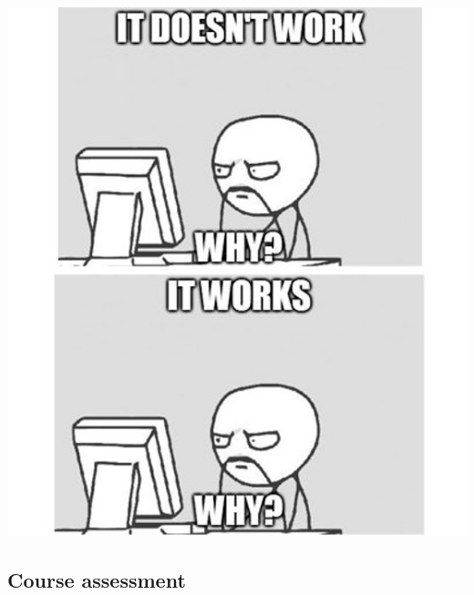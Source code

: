 \documentclass[
  letterpaper,
  DIV=11,
  numbers=noendperiod]{scrartcl}
\begin{document}
\includegraphics{InClassStatic/worksDoesntWork.jpg}

\hypertarget{course-assessment}{%
\subsection{Course assessment}\label{course-assessment}}
\end{document}
